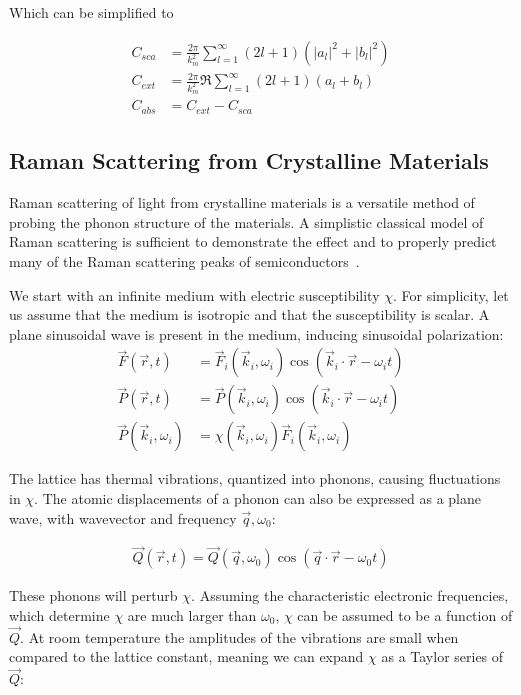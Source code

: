         Which can be simplified to

        \begin{align}
            C_{sca} &= \frac{2\pi}{k^2_m}\sum_{l=1}^\infty (2l +1)(|a_l|^2 + |b_l|^2)\\
            C_{ext} &= \frac{2\pi}{k^2_m}\Re\sum_{l=1}^\infty (2l +1)(a_l + b_l)\\
            C_{abs} &= C_{ext} - C_{sca}
        \end{align}

\clearpage

\subsection{Raman Scattering from Crystalline Materials}
\label{ap:Raman}
    Raman scattering of light from crystalline materials is a versatile method of probing the phonon structure of the materials.
    A simplistic classical model of Raman scattering is sufficient to demonstrate the effect and to properly predict many of the
    Raman scattering peaks of semiconductors~\cite{peter2010fundamentals}.

    We start with an infinite medium with electric susceptibility $\chi$. For simplicity, let us assume that the medium is isotropic
    and that the susceptibility is scalar. A plane sinusoidal wave is present in the medium, inducing sinusoidal polarization:
    \begin{align}
        \vec{F}(\vec{r}, t) &= \vec{F}_i(\vec{k}_i, \omega_i)\cos(\vec{k}_i\cdot\vec{r} - \omega_i t) \\
        \vec{P}(\vec{r}, t) &= \vec{P}(\vec{k}_i, \omega_i)\cos(\vec{k}_i\cdot\vec{r} - \omega_i t) \\
        \vec{P}(\vec{k}_i, \omega_i) &= \chi(\vec{k}_i, \omega_i)\vec{F}_i(\vec{k}_i, \omega_i)
    \end{align}

    The lattice has thermal vibrations, quantized into phonons, causing fluctuations in $\chi$. The atomic displacements of a phonon
    can also be expressed as a plane wave, with wavevector and frequency $\vec{q}, \omega_0$:

    \begin{align}
        \vec{Q}(\vec{r}, t) = \vec{Q}(\vec{q},\omega_0)\cos(\vec{q}\cdot\vec{r}-\omega_0 t)
    \end{align}

    These phonons will perturb $\chi$. Assuming the characteristic electronic frequencies, which determine $\chi$ are
    much larger than $\omega_0$, $\chi$ can be assumed to be a function of $\vec{Q}$. At room temperature the
    amplitudes of the vibrations are small when compared to the lattice constant, meaning we can expand $\chi$ as
    a Taylor series of $\vec{Q}$:

